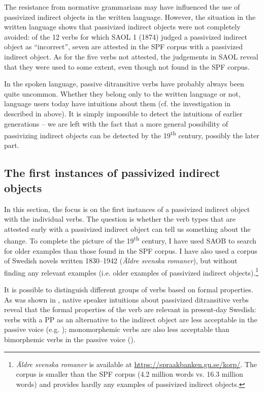 \documentclass[output=paper]{langscibook}
\begin{document}
The resistance from normative grammarians may have influenced the use of passivized indirect objects in the written language. However, the situation in the written language shows that passivized indirect objects were not completely avoided: of the 12 verbs for which SAOL 1 (1874) judged a passivized indirect object as “incorrect”, seven are attested in the SPF corpus with a passivized indirect object. As for the five verbs not attested, the judgements in SAOL reveal that they were used to some extent, even though not found in the SPF corpus.



In the spoken language, passive ditransitive verbs have probably always been quite uncommon. Whether they belong only to the written language or not, language users today have intuitions about them (cf. the investigation in \citealt{HaddicanHolmberg2019} described in  above). It is simply impossible to detect the intuitions of earlier generations – we are left with the fact that a more general possibility of passivizing indirect objects can be detected by the 19\textsuperscript{th} century, possibly the later part.


\subsection{The first instances of passivized indirect objects}\label{sec:falk:3.7}\largerpage


In this section, the focus is on the first instances of a passivized indirect object with the individual verbs. The question is whether the verb types that are attested early with a passivized indirect object can tell us something about the change. To complete the picture of the 19\textsuperscript{th} century, I have used SAOB to search for older examples than those found in the SPF corpus. I have also used a corpus of Swedish novels written 1830–1942 (\textit{Äldre svenska romaner}), but without finding any relevant examples (i.e. older examples of passivized indirect objects).\footnote{\textit{Äldre svenska romaner} is available at \url{https://spraakbanken.gu.se/korp/}. The corpus is smaller than the SPF corpus (4.2 million words vs. 16.3 million words) and provides hardly any examples of passivized indirect objects.}


It is possible to distinguish different groups of verbs based on formal properties. As was shown in , native speaker intuitions about passivized ditransitive verbs reveal that the formal properties of the verb are relevant in present-day Swedish: verbs with a PP as an alternative to the indirect object are less acceptable in the passive voice (e.g. \citealt{Anward1989}); monomorphemic verbs are also less acceptable than bimorphemic verbs in the passive voice (\citealt{HolmbergPlatzack1995,HaddicanHolmberg2019}).
\end{document}
